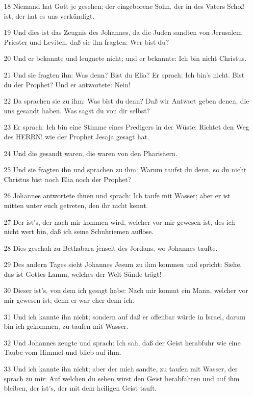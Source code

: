 \par 18 Niemand hat Gott je gesehen; der eingeborene Sohn, der in des Vaters Schoß ist, der hat es uns verkündigt.
\par 19 Und dies ist das Zeugnis des Johannes, da die Juden sandten von Jerusalem Priester und Leviten, daß sie ihn fragten: Wer bist du?
\par 20 Und er bekannte und leugnete nicht; und er bekannte: Ich bin nicht Christus.
\par 21 Und sie fragten ihn: Was denn? Bist du Elia? Er sprach: Ich bin's nicht. Bist du der Prophet? Und er antwortete: Nein!
\par 22 Da sprachen sie zu ihm: Was bist du denn? Daß wir Antwort geben denen, die uns gesandt haben. Was sagst du von dir selbst?
\par 23 Er sprach: Ich bin eine Stimme eines Predigers in der Wüste: Richtet den Weg des HERRN! wie der Prophet Jesaja gesagt hat.
\par 24 Und die gesandt waren, die waren von den Pharisäern.
\par 25 Und sie fragten ihn und sprachen zu ihm: Warum taufst du denn, so du nicht Christus bist noch Elia noch der Prophet?
\par 26 Johannes antwortete ihnen und sprach: Ich taufe mit Wasser; aber er ist mitten unter euch getreten, den ihr nicht kennt.
\par 27 Der ist's, der nach mir kommen wird, welcher vor mir gewesen ist, des ich nicht wert bin, daß ich seine Schuhriemen auflöse.
\par 28 Dies geschah zu Bethabara jenseit des Jordans, wo Johannes taufte.
\par 29 Des andern Tages sieht Johannes Jesum zu ihm kommen und spricht: Siehe, das ist Gottes Lamm, welches der Welt Sünde trägt!
\par 30 Dieser ist's, von dem ich gesagt habe: Nach mir kommt ein Mann, welcher vor mir gewesen ist; denn er war eher denn ich.
\par 31 Und ich kannte ihn nicht; sondern auf daß er offenbar würde in Israel, darum bin ich gekommen, zu taufen mit Wasser.
\par 32 Und Johannes zeugte und sprach: Ich sah, daß der Geist herabfuhr wie eine Taube vom Himmel und blieb auf ihm.
\par 33 Und ich kannte ihn nicht; aber der mich sandte, zu taufen mit Wasser, der sprach zu mir: Auf welchen du sehen wirst den Geist herabfahren und auf ihm bleiben, der ist's, der mit dem heiligen Geist tauft.
